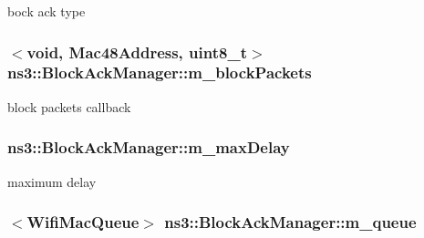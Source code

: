 bock ack type 

\subsubsection[{\texorpdfstring{m\+\_\+block\+Packets}{m_blockPackets}}]{$<$void, {\bf Mac48\+Address}, uint8\+\_\+t$>$ ns3\+::\+Block\+Ack\+Manager\+::m\+\_\+block\+Packets\hspace{0.3cm}{\ttfamily [private]}}\hypertarget{classns3_1_1BlockAckManager_aed8b4d86e877d3e5a2ed869636328867}{}\label{classns3_1_1BlockAckManager_aed8b4d86e877d3e5a2ed869636328867}


block packets callback 

\subsubsection[{\texorpdfstring{m\+\_\+max\+Delay}{m_maxDelay}}]{ ns3\+::\+Block\+Ack\+Manager\+::m\+\_\+max\+Delay\hspace{0.3cm}{\ttfamily [private]}}\hypertarget{classns3_1_1BlockAckManager_a5eabe70b6e25dac515f8ec6c38d45f75}{}\label{classns3_1_1BlockAckManager_a5eabe70b6e25dac515f8ec6c38d45f75}


maximum delay 

\subsubsection[{\texorpdfstring{m\+\_\+queue}{m_queue}}]{$<${\bf Wifi\+Mac\+Queue}$>$ ns3\+::\+Block\+Ack\+Manager\+::m\+\_\+queue\hspace{0.3cm}{\ttfamily [private]}}\hypertarget{classns3_1_1BlockAckManager_a5bc9e0d123696600bbeff7aa37127ec7}{}\label{classns3_1_1BlockAckManager_a5bc9e0d123696600bbeff7aa37127ec7}


